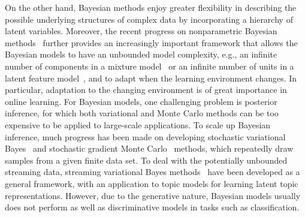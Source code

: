 \documentclass[twoside,11pt]{article}
\begin{document}
On the other hand, Bayesian methods enjoy greater flexibility in describing the possible underlying structures of complex data by incorporating a hierarchy of latent variables. Moreover, the recent progress on nonparametric Bayesian methods~\citep{hjort2010bayesian,teh2006hierarchical} further provides an increasingly important framework that allows the Bayesian models to have an unbounded model complexity, e.g., an infinite number of components in a mixture model~\citep{hjort2010bayesian} or an infinite number of units in a latent feature model~\citep{Griffiths:tr05}, and to adapt when the learning environment changes. In particular, adaptation to the changing environment is of great importance in online learning. For Bayesian models, one challenging problem is posterior inference, for which both variational and Monte Carlo methods can be too expensive to be applied to large-scale applications. To scale up Bayesian inference, much progress has been made on developing stochastic variational Bayes~\citep{hoffman2013stochastic,mimno2012sparse} and stochastic gradient Monte Carlo~\citep{welling2011bayesian,welling2012mc} methods, which repeatedly draw samples from a given finite data set. To deal with the potentially unbounded streaming data, streaming variational Bayes methods~\citep{broderick2013streaming} have been developed as a general framework, with an application to topic models for learning latent topic representations. However, due to the generative nature, Bayesian models usually does not perform as well as discriminative models in tasks such as classification.
\end{document}

